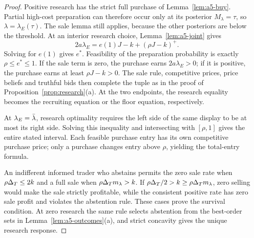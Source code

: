 \begin{proof}
Positive research has the strict full purchase of Lemma~\ref{lem:a5-buy}. Partial high-cost preparation can
therefore occur only at its posterior \(M_\lambda=\tau\), so \(\lambda=\lambda_E(\tau)\).
The sale lemma still applies, because the other posteriors are below the threshold. At an interior research
choice, Lemma~\ref{lem:a5-joint} gives
\[
 2a\lambda_E=e(1)J-k+(\rho J-k)^+.
\]
Solving for \(e(1)\) gives \(e^*\). Feasibility of the preparation probability is exactly
\(\rho\le e^*\le1\). If the sale term is zero, the purchase earns \(2a\lambda_E>0\); if it is positive,
the purchase earns at least \(\rho J-k>0\). The sale rule, competitive prices, price beliefs and truthful
bids then complete the tuple as in the proof of Proposition~\ref{prop:research}(a). At the two endpoints,
the research equality becomes the recruiting equation or the floor equation, respectively.

At \(\lambda_E=\bar\lambda\), research optimality requires the left side of the same display to be at most its
right side. Solving this inequality and intersecting with \([\rho,1]\) gives the entire stated interval.
Each feasible purchase entry has its own competitive purchase price; only a purchase changes entry above
\(\rho\), yielding the total-entry formula.

An indifferent informed trader who abstains permits the zero sale rate when \(\rho\Delta_T\le2k\) and a full sale
when \(\rho\Delta_T m_\lambda>k\). If \(\rho\Delta_T/2>k\ge\rho\Delta_T m_\lambda\), zero selling would make the sale
strictly profitable, while the consistent positive rate has zero sale profit and violates the abstention
rule. These cases prove the survival condition. At zero research the same rule selects abstention from
the best-order sets in Lemma~\ref{lem:a5-outcomes}(a), and strict concavity gives the unique research response.
\end{proof}

